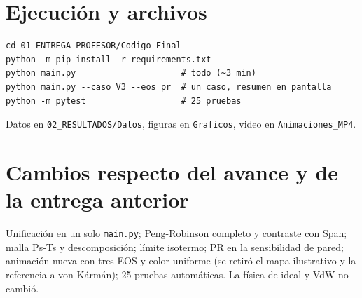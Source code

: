 \documentclass[11pt]{article}
\begin{document}
\appendix
\section{Ejecución y archivos}
\begin{verbatim}
cd 01_ENTREGA_PROFESOR/Codigo_Final
python -m pip install -r requirements.txt
python main.py                     # todo (~3 min)
python main.py --caso V3 --eos pr  # un caso, resumen en pantalla
python -m pytest                   # 25 pruebas
\end{verbatim}
Datos en \texttt{02\_RESULTADOS/Datos}, figuras en \texttt{Graficos}, video en \texttt{Animaciones\_MP4}.

\section{Cambios respecto del avance y de la entrega anterior}
Unificación en un solo \texttt{main.py}; Peng-Robinson completo y contraste con Span; malla Ps-Ts y descomposición;
límite isotermo; PR en la sensibilidad de pared; animación nueva con tres EOS y color uniforme (se retiró el mapa
ilustrativo y la referencia a von Kármán); 25 pruebas automáticas. La física de ideal y VdW no cambió.
\end{document}
